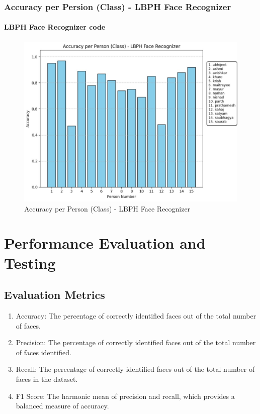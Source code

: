 \documentclass[openany]{report}
\begin{document}
\subsection{Accuracy per Persion (Class) - LBPH Face Recognizer}
\subsubsection{LBPH Face Recognizer code}
\lstset{language=Python, basicstyle=\ttfamily\small, numbers=left}

\begin{figure}[H]
    \centering
    \includegraphics[width=.95\textwidth]{../imgs/accuracy per person.jpg}
    \caption{Accuracy per Person (Class) - LBPH Face Recognizer}
\end{figure}

\chapter{Performance Evaluation and Testing}
\section{Evaluation Metrics}

\begin{enumerate}
    \item Accuracy: The percentage of correctly identified faces out of the total number of faces.
    \item Precision: The percentage of correctly identified faces out of the total number of faces identified.
    \item Recall: The percentage of correctly identified faces out of the total number of faces in the dataset.
    \item F1 Score: The harmonic mean of precision and recall, which provides a balanced measure of accuracy.
\end{enumerate}
\end{document}
